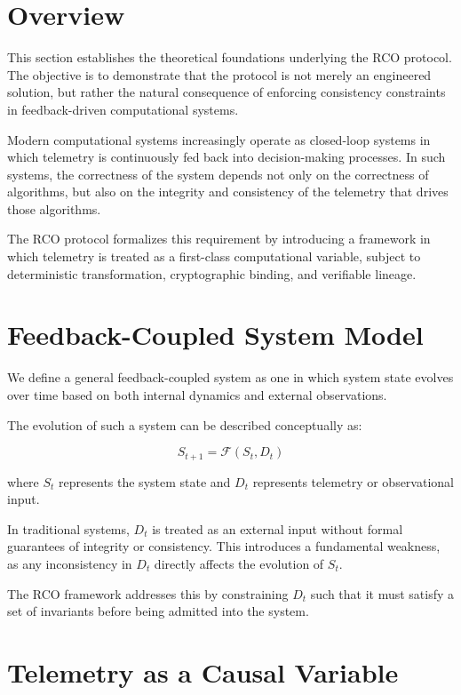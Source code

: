\section{Overview}

This section establishes the theoretical foundations underlying the RCO protocol. The objective is to demonstrate that the protocol is not merely an engineered solution, but rather the natural consequence of enforcing consistency constraints in feedback-driven computational systems.

Modern computational systems increasingly operate as closed-loop systems in which telemetry is continuously fed back into decision-making processes. In such systems, the correctness of the system depends not only on the correctness of algorithms, but also on the integrity and consistency of the telemetry that drives those algorithms.

The RCO protocol formalizes this requirement by introducing a framework in which telemetry is treated as a first-class computational variable, subject to deterministic transformation, cryptographic binding, and verifiable lineage.

\section{Feedback-Coupled System Model}

We define a general feedback-coupled system as one in which system state evolves over time based on both internal dynamics and external observations.

The evolution of such a system can be described conceptually as:

\begin{equation}
S_{t+1} = \mathcal{F}(S_t, D_t)
\end{equation}

where $S_t$ represents the system state and $D_t$ represents telemetry or observational input.

In traditional systems, $D_t$ is treated as an external input without formal guarantees of integrity or consistency. This introduces a fundamental weakness, as any inconsistency in $D_t$ directly affects the evolution of $S_t$.

The RCO framework addresses this by constraining $D_t$ such that it must satisfy a set of invariants before being admitted into the system.

\section{Telemetry as a Causal Variable}

